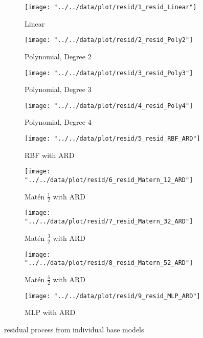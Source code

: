 \documentclass[11pt]{article}
\theoremstyle{definition}
\begin{document}
\begin{figure}[ht]
\centering
\begin{subfigure}{.33\textwidth}
  \centering
  \texttt{[image: "../../data/plot/resid/1\_resid\_Linear"]}
  \caption{Linear}
  \label{fig:sfig11}
\end{subfigure}\hspace*{-0.1em}
\begin{subfigure}{.33\textwidth}
  \centering
  \texttt{[image: "../../data/plot/resid/2\_resid\_Poly2"]}
  \caption{Polynomial, Degree 2}
  \label{fig:sfig12}
\end{subfigure}\hspace*{-0.1em}
\begin{subfigure}{.33\textwidth}
  \centering
  \texttt{[image: "../../data/plot/resid/3\_resid\_Poly3"]}
  \caption{Polynomial, Degree 3}
  \label{fig:sfig13}
\end{subfigure}

\begin{subfigure}{.33\textwidth}
  \centering
  \texttt{[image: "../../data/plot/resid/4\_resid\_Poly4"]}
  \caption{Polynomial, Degree 4}
  \label{fig:sfig21}
\end{subfigure}\hspace*{-0.1em}
\begin{subfigure}{.33\textwidth}
  \centering
  \texttt{[image: "../../data/plot/resid/5\_resid\_RBF\_ARD"]}
  \caption{RBF with ARD}
  \label{fig:sfig22}
\end{subfigure}\hspace*{-0.1em}
\begin{subfigure}{.33\textwidth}
  \centering
  \texttt{[image: "../../data/plot/resid/6\_resid\_Matern\_12\_ARD"]}
  \caption{Mat\'{e}n $\frac{1}{2}$ with ARD}
  \label{fig:sfig23}
\end{subfigure}

\begin{subfigure}{.33\textwidth}
  \centering
  \texttt{[image: "../../data/plot/resid/7\_resid\_Matern\_32\_ARD"]}
  \caption{Mat\'{e}n $\frac{3}{2}$ with ARD}
  \label{fig:sfig21}
\end{subfigure}\hspace*{-0.1em}
\begin{subfigure}{.33\textwidth}
  \centering
  \texttt{[image: "../../data/plot/resid/8\_resid\_Matern\_52\_ARD"]}
  \caption{Mat\'{e}n $\frac{5}{2}$ with ARD}
  \label{fig:sfig22}
\end{subfigure}\hspace*{-0.1em}
\begin{subfigure}{.33\textwidth}
  \centering
  \texttt{[image: "../../data/plot/resid/9\_resid\_MLP\_ARD"]}
  \caption{MLP with ARD}
  \label{fig:sfig23}
\end{subfigure}

\caption{residual process from individual base models}
\label{fig:res}
\end{figure}
\end{document}
